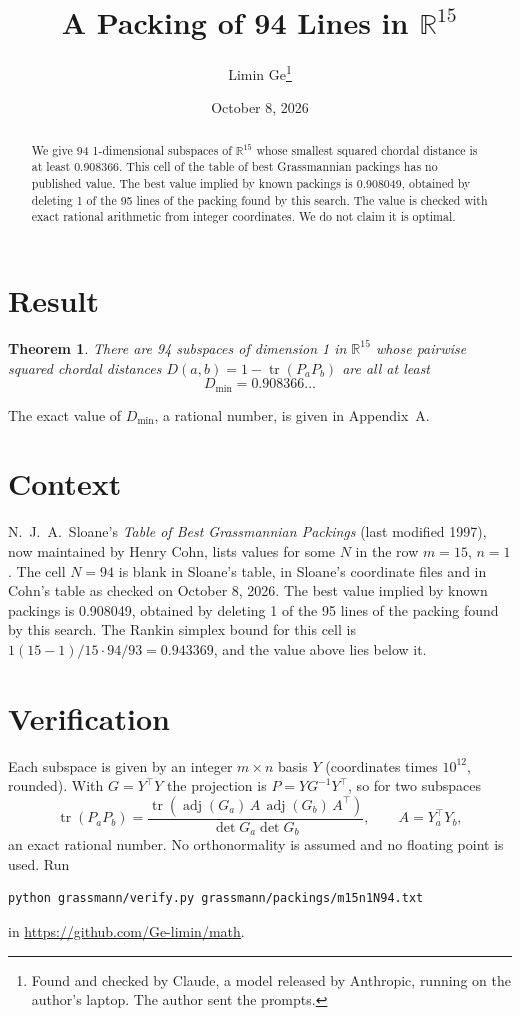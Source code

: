 \documentclass[11pt,a4paper]{article}
\title{A Packing of 94 Lines in $\mathbb{R}^{15}$}
\author{Limin Ge\thanks{Found and checked by Claude, a model released by Anthropic, running on the author's laptop. The author sent the prompts.}}
\date{October 8, 2026}
\newtheorem*{theorem}{Theorem}
\begin{document}
\maketitle
\begin{abstract}
We give 94 1-dimensional subspaces of $\mathbb{R}^{15}$ whose smallest squared chordal distance is at least 0.908366. This cell of the table of best Grassmannian packings has no published value. The best value implied by known packings is 0.908049, obtained by deleting 1 of the 95 lines of the packing found by this search. The value is checked with exact rational arithmetic from integer coordinates. We do not claim it is optimal.
\end{abstract}

\section{Result}
\begin{theorem}
There are 94 subspaces of dimension 1 in $\mathbb{R}^{15}$ whose pairwise squared chordal distances $D(a,b) = 1 - \operatorname{tr}(P_aP_b)$ are all at least
\[ D_{\min} = 0.908366\ldots \]
\end{theorem}
The exact value of $D_{\min}$, a rational number, is given in Appendix~A.


\section{Context}
N.~J.~A.~Sloane's \emph{Table of Best Grassmannian Packings} (last modified 1997), now maintained by Henry Cohn, lists values for some $N$ in the row $m=15$, $n=1$. The cell $N=94$ is blank in Sloane's table, in Sloane's coordinate files and in Cohn's table as checked on October 8, 2026. The best value implied by known packings is 0.908049, obtained by deleting 1 of the 95 lines of the packing found by this search. The Rankin simplex bound for this cell is $1(15-1)/15\cdot 94/93 = 0.943369$, and the value above lies below it.


\section{Verification}
Each subspace is given by an integer $m\times n$ basis $Y$ (coordinates times $10^{12}$, rounded). With $G=Y^\top Y$ the projection is $P=YG^{-1}Y^\top$, so for two subspaces
\[ \operatorname{tr}(P_aP_b)=\frac{\operatorname{tr}(\operatorname{adj}(G_a)\,A\,\operatorname{adj}(G_b)\,A^\top)}{\det G_a\det G_b},\qquad A=Y_a^\top Y_b, \]
an exact rational number. No orthonormality is assumed and no floating point is used. Run
\begin{verbatim}
python grassmann/verify.py grassmann/packings/m15n1N94.txt
\end{verbatim}
in \url{https://github.com/Ge-limin/math}.
\end{document}
